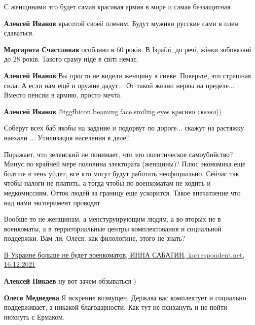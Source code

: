 \begin{itemize}
С женщинами это будет самая красивая армия в мире и самая беззащитная.

\begin{itemize} %
\textbf{Алексей Иванов} красотой своей пленим. Будут мужики русские сами в плен сдаваться.

\textbf{Маргарита Счастливая} особливо в 60 років. В Ізраїлі, до речі, жінки зобовязані до 28 років. Такого сраму ніде в світі немає.

\textbf{Алексей Иванов} Вы просто не видели женщину в гневе. Поверьте, это страшная сила. А если нам ещё и оружие дадут... От такой жизни нервы на пределе... Вместо пенсии в армию, просто мечта.

\textbf{Алексей Иванов}  @igg{fbicon.beaming.face.smiling.eyes} красиво сказал))

Соберут всех баб якобы на задание и подорвут по дороге... скажут на растяжку наехали ... Утилизация населения в деле!!
\end{itemize} %


Поражает, что зеленский не понимает, что это политическое самоубийство? Минус
по крайней мере половина электората (женщины)? Плюс экономика еще болтше в тень
уйдет, все кто могут будут работать неофициально. Сейчас так чтобы налоги не
платить, а тогда чтобы по военкоматам не ходить и медкомиссиям. Отток людей за
границу еще ускорится. Такое впечатление что над нами эксперимент проводят


Вообще-то не женщинам, а менстуруирующим людям, а во-вторых не в военкоматы, а
в территориальные центры комплектования и социальной поддержки. Вам ли, Олеся,
как филологине, этого не знать?

\href{https://korrespondent.net/ukraine/4428093-v-ukrayne-bolshe-ne-budet-voenkomatov}{%
В Украине больше не будет военкоматов, ИННА САБАТИН, korrespondent.net, 16.12.2021%
}

\begin{itemize} %
\textbf{Алексей Пикаев} ну вот зачем обзываться )

\textbf{Олеся Медведева} Я искренне возмущен. Держава вас комплектует и социально поддерживает, а никакой благодарности. Как тут не психануть и не пойти нюхнуть с Ермаком.
\end{itemize} %


\end{itemize}
